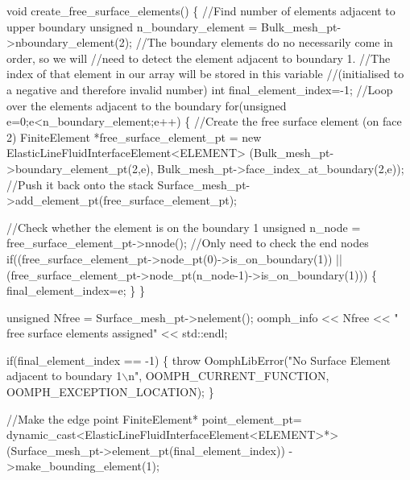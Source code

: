 \begin{DoxyCodeInclude}
 \textcolor{keywordtype}{void} create\_free\_surface\_elements()
  \{
   \textcolor{comment}{//Find number of elements adjacent to upper boundary}
   \textcolor{keywordtype}{unsigned} n\_boundary\_element = Bulk\_mesh\_pt->nboundary\_element(2);
   \textcolor{comment}{//The boundary elements do no necessarily come in order, so we will}
   \textcolor{comment}{//need to detect the element adjacent to boundary 1.}
   \textcolor{comment}{//The index of that element in our array will be stored in this variable}
   \textcolor{comment}{//(initialised to a negative and therefore invalid number)}
   \textcolor{keywordtype}{int} final\_element\_index=-1;
   \textcolor{comment}{//Loop over the elements adjacent to the boundary}
   \textcolor{keywordflow}{for}(\textcolor{keywordtype}{unsigned} e=0;e<n\_boundary\_element;e++)
    \{
     \textcolor{comment}{//Create the free surface element (on face 2)}
     FiniteElement *free\_surface\_element\_pt 
      = \textcolor{keyword}{new} ElasticLineFluidInterfaceElement<ELEMENT>
      (Bulk\_mesh\_pt->boundary\_element\_pt(2,e),
       Bulk\_mesh\_pt->face\_index\_at\_boundary(2,e));
     \textcolor{comment}{//Push it back onto the stack}
     Surface\_mesh\_pt->add\_element\_pt(free\_surface\_element\_pt);       

      \textcolor{comment}{//Check whether the element is on the boundary 1}
      \textcolor{keywordtype}{unsigned} n\_node = free\_surface\_element\_pt->nnode();
      \textcolor{comment}{//Only need to check the end nodes}
      \textcolor{keywordflow}{if}((free\_surface\_element\_pt->node\_pt(0)->is\_on\_boundary(1)) ||
         (free\_surface\_element\_pt->node\_pt(n\_node-1)->is\_on\_boundary(1)))
       \{
          final\_element\_index=e;
       \}
    \}

   \textcolor{keywordtype}{unsigned} Nfree = Surface\_mesh\_pt->nelement();
   oomph\_info << Nfree << \textcolor{stringliteral}{" free surface elements assigned"} << std::endl;

    \textcolor{keywordflow}{if}(final\_element\_index == -1)
     \{
      \textcolor{keywordflow}{throw} OomphLibError(\textcolor{stringliteral}{"No Surface Element adjacent to boundary 1\(\backslash\)n"},
                          OOMPH\_CURRENT\_FUNCTION,
                          OOMPH\_EXCEPTION\_LOCATION);
     \}
   
    \textcolor{comment}{//Make the edge point}
    FiniteElement* point\_element\_pt= 
     \textcolor{keyword}{dynamic\_cast<}ElasticLineFluidInterfaceElement<ELEMENT>*\textcolor{keyword}{>}
     (Surface\_mesh\_pt->element\_pt(final\_element\_index))
     ->make\_bounding\_element(1);
    

\end{DoxyCodeInclude}
